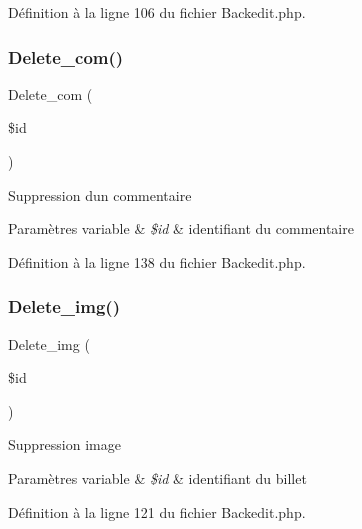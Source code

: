 Définition à la ligne 106 du fichier Backedit.\+php.

\mbox{\label{class_src_1_1_controllers_1_1_backedit_a38147e014898a3417c74b23e903621b0}} 
\subsubsection{\texorpdfstring{Delete\+\_\+com()}{Delete\_com()}}
{\footnotesize\ttfamily Delete\+\_\+com (\begin{DoxyParamCaption}\item[{}]{\$id }\end{DoxyParamCaption})}

Suppression d\textquotesingle{}un commentaire 
\begin{DoxyParams}[1]{Paramètres}
variable & {\em \$id} & identifiant du commentaire \\
\hline
\end{DoxyParams}


Définition à la ligne 138 du fichier Backedit.\+php.

\mbox{\label{class_src_1_1_controllers_1_1_backedit_a7da0978ffd29442d84e0d4374cb07e8a}} 
\subsubsection{\texorpdfstring{Delete\+\_\+img()}{Delete\_img()}}
{\footnotesize\ttfamily Delete\+\_\+img (\begin{DoxyParamCaption}\item[{}]{\$id }\end{DoxyParamCaption})}

Suppression image 
\begin{DoxyParams}[1]{Paramètres}
variable & {\em \$id} & identifiant du billet \\
\hline
\end{DoxyParams}


Définition à la ligne 121 du fichier Backedit.\+php.

